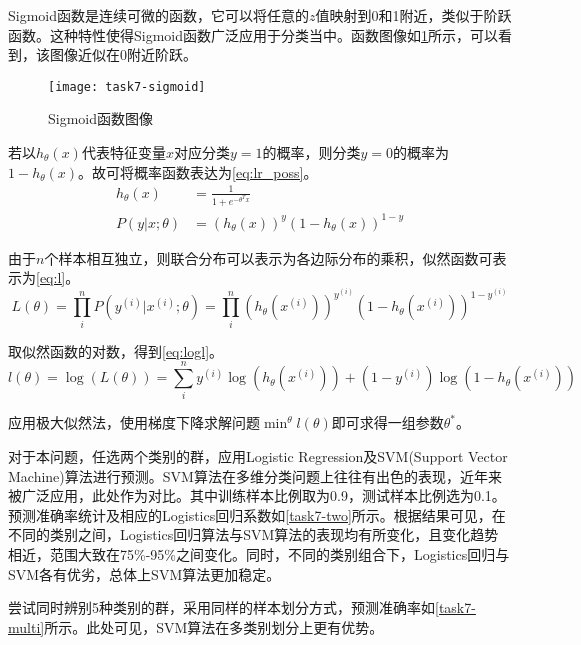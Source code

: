 \documentclass[a4paper,12pt]{article}
\begin{document}
    Sigmoid函数是连续可微的函数，它可以将任意的$z$值映射到0和1附近，类似于阶跃函数。这种特性使得Sigmoid函数广泛应用于分类当中。函数图像如\cref{fig:sigmoid}所示，可以看到，该图像近似在0附近阶跃。
    \begin{figure}
      \centering
      \texttt{[image: task7-sigmoid]}
      \caption{Sigmoid函数图像}
      \label{fig:sigmoid}
    \end{figure}

    若以$h_\theta(x)$代表特征变量$x$对应分类$y=1$的概率，则分类$y=0$的概率为$1-h_\theta(x)$。故可将概率函数表达为\cref{eq:lr_poss}。
    \begin{equation}
      \label{eq:lr_poss}
      \begin{aligned}
        h_\theta(x) &= \frac{1}{1+e^{-\theta^T x}} \\
        P(y|x;\theta) &= (h_\theta(x))^y (1-h_\theta(x))^{1-y}
      \end{aligned}
    \end{equation}

    由于$n$个样本相互独立，则联合分布可以表示为各边际分布的乘积，似然函数可表示为\cref{eq:l}。
    \begin{equation}
      \label{eq:l}
      L(\theta) = \prod_{i}^n {P(y^{(i)}|x^{(i)};\theta)} = \prod_{i}^n {(h_\theta(x^{(i)}))^{y^{(i)}} (1-h_\theta(x^{(i)}))^{1-y^{(i)}}}
    \end{equation}

    取似然函数的对数，得到\cref{eq:logl}。
    \begin{equation}
      \label{eq:logl}
      l(\theta) = \log(L(\theta)) = \sum_{i}^n {y^{(i)} \log(h_\theta(x^{(i)})) + (1 - y^{(i)}) \log(1-h_\theta(x^{(i)}))}
    \end{equation}

    应用极大似然法，使用梯度下降求解问题$\min^{\theta} l(\theta)$即可求得一组参数$\theta^*$。

    对于本问题，任选两个类别的群，应用Logistic Regression及SVM(Support Vector Machine)算法进行预测。SVM算法在多维分类问题上往往有出色的表现，近年来被广泛应用，此处作为对比。其中训练样本比例取为0.9，测试样本比例选为0.1。预测准确率统计及相应的Logistics回归系数如\cref{task7-two}所示。根据结果可见，在不同的类别之间，Logistics回归算法与SVM算法的表现均有所变化，且变化趋势相近，范围大致在75\%-95\%之间变化。同时，不同的类别组合下，Logistics回归与SVM各有优劣，总体上SVM算法更加稳定。
    

    尝试同时辨别5种类别的群，采用同样的样本划分方式，预测准确率如\cref{task7-multi}所示。此处可见，SVM算法在多类别划分上更有优势。
    
    \label{applastpage}
    \newpage
    
    
\iffalse
\begin{itemize}[noitemsep,topsep=0pt]
\end{itemize}
\begin{enumerate}[label=\Roman{*}.,noitemsep,topsep=0pt]
\end{enumerate}
\begin{multicols}{2}
\end{multicols}
\fi
\end{document}
